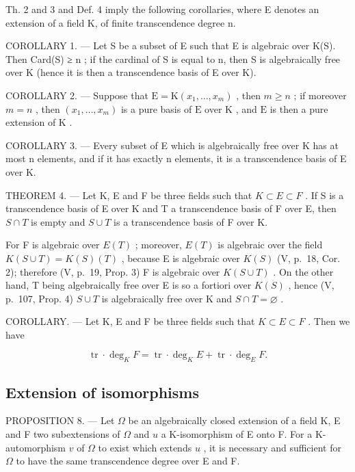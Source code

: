 Th. 2 and 3 and Def. 4 imply the following corollaries, where E denotes an extension of a field K, of finite transcendence degree n.

COROLLARY 1. --- Let S be a subset of E such that E is algebraic over K(S). Then Card(S) ≥ n ; if the cardinal of S is equal to n, then S is algebraically free over K (hence it is then a transcendence basis of E over K).

COROLLARY 2. --- Suppose that \(\mathrm{E} = \mathrm{K}(x_1, \ldots, x_m)\) , then \(m \geqslant n\) ; if moreover \(m = n\) , then \((x_1, \ldots, x_m)\) is a pure basis of \(\mathrm{E}\) over \(\mathrm{K}\) , and \(\mathrm{E}\) is then a pure extension of \(\mathrm{K}\) .

COROLLARY 3. --- Every subset of E which is algebraically free over K has at most n elements, and if it has exactly n elements, it is a transcendence basis of E over K.

THEOREM 4. --- Let K, E and F be three fields such that \(K \subset E \subset F\) . If S is a transcendence basis of E over K and T a transcendence basis of F over E, then \(S \cap T\) is empty and \(S \cup T\) is a transcendence basis of F over K.

For F is algebraic over \(E(T)\) ; moreover, \(E(T)\) is algebraic over the field \(K(S \cup T) = K(S)(T)\) , because E is algebraic over \(K(S)\) (V, p.~18, Cor. 2); therefore (V, p.~19, Prop. 3) F is algebraic over \(K(S \cup T)\) . On the other hand, T being algebraically free over E is so a fortiori over \(K(S)\) , hence (V, p.~107, Prop. 4) \(S \cup T\) is algebraically free over K and \(S \cap T = \varnothing\) .

COROLLARY. --- Let K, E and F be three fields such that \(K \subset E \subset F\) . Then we have

\[
\operatorname{tr} \cdot \deg_ {K} F = \operatorname{tr} \cdot \deg_ {K} E + \operatorname{tr} \cdot \deg_ {E} F.\tag{1}
\]

\subsection{Extension of isomorphisms}

PROPOSITION 8. --- Let \(\Omega\) be an algebraically closed extension of a field K, E and F two subextensions of \(\Omega\) and \(u\) a K-isomorphism of E onto F. For a K-automorphism \(v\) of \(\Omega\) to exist which extends \(u\) , it is necessary and sufficient for \(\Omega\) to have the same transcendence degree over E and F.

